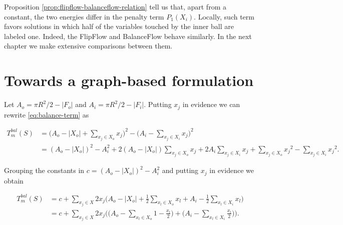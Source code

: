 Proposition \ref{prop:flipflow-balanceflow-relation} tell us that, apart  from a constant, the two energies differ in the penalty term $P_1(X_i)$. Locally, such term favors solutions in which half of the variables touched by the inner ball are labeled one. Indeed, the FlipFlow and BalanceFlow behave similarly. In the next chapter we make extensive comparisons between them.


\section{Towards a graph-based formulation}

Let $A_o = \pi R^2 / 2 - |F_o|$ and $A_i = \pi R^2/2 - |F_i|$. Putting $x_j$ in evidence we can rewrite \eqref{eq:balance-term} as

\begin{align*}
	T_{m}^{bal}(S) &= \Big(A_o - |X_o| + \sum_{x_j \in X_o}{x_j} \Big)^2 - \Big(A_i - \sum_{x_j \in X_i}{x_j}\Big)^2 \\
	&= (A_o - |X_o|)^2 - A_i^2 + 2(A_o - |X_o|)\sum_{x_j \in X_o}{x_j} + 2A_i\sum_{x_j \in X_i}{x_j} + \sum_{x_j \in X_o}{x_j}^2 - \sum_{x_j \in X_i}{x_j}^2.
\end{align*} 

Grouping the constants in $c=(A_o - |X_o|)^2 - A_i^2$ and putting $x_j$ in evidence we obtain

\begin{align}
	T_{m}^{bal}(S) 	&= c +\sum_{x_j \in X}{ 2x_j\Big( A_o - |X_o| + \frac{1}{2}\sum_{x_l \in X_o}{x_l} + A_i - \frac{1}{2}\sum_{x_l \in X_i}{x_l}\Big)} \nonumber \\
	&= c +\sum_{x_j \in X}{2x_j\Bigg( \Big(A_o - \sum_{x_l \in X_o}{1-\frac{x_l}{2}}\Big) + \Big(A_i - \sum_{x_l \in X_i}{\frac{x_l}{2}}\Big)\Bigg)}.
	\label{eq:xj-evidence}
\end{align}

